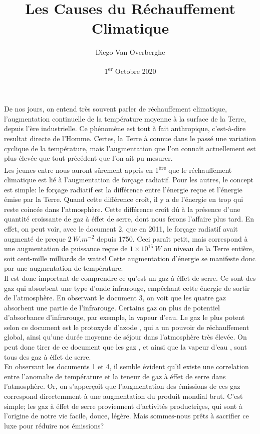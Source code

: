 \documentclass[12pt]{article}
\title{Les Causes du Réchauffement Climatique}
\author{Diego Van Overberghe}
\date{1\textsuperscript{er} Octobre 2020}
\begin{document}
    \maketitle
    De nos jours, on entend très souvent parler de réchauffement climatique, l'augmentation continuelle de la température moyenne à la surface de la Terre, depuis l'ère industrielle. Ce phénomène est tout à fait anthropique, c'est-à-dire resultat directe de l'Homme. Certes, la Terre à connue dans le passé une variation cyclique de la température, mais l'augmentation que l'on connaît actuellement est plus élevée que tout précédent que l'on ait pu mesurer. \\[1ex]

    \indent Les jeunes entre nous auront sûrement appris en 1\textsuperscript{ère} que le réchauffement climatique est lié à l'augmentation de forçage radiatif. Pour les autres, le concept est simple: le forçage radiatif est la différence entre l'énergie reçue et l'énergie émise par la Terre. Quand cette différence croît, il y a de l'énergie en \guillemotleft{} trop \guillemotright{} qui reste coincée dans l'atmosphère. Cette différence croît dû à la présence d'une quantité croissante de gaz à éffet de serre, dont nous ferons l'affaire plus tard. En effet, on peut voir, avec le document 2, que en 2011, le forçage radiatif avait augmenté de preque $2\ \si{W.m^{-2}}$ depuis 1750. Ceci paraît petit, mais correspond à une augmentation de puissance reçue de $1\times 10^{15}\ \si{W}$ au niveau de la Terre entière, soit cent-mille milliards de watts! Cette augmentation d'énergie se manifeste donc par une augmentation de température. \\[1ex]

    \indent Il est donc important de comprendre ce qu'est un gaz à éffet de serre. Ce sont des gaz qui absorbent une type d'onde infrarouge, empêchant cette énergie de sortir de l'atmosphère. En observant le document 3, on voit que les quatre gaz absorbent une partie de l'infrarouge. Certains gaz on plus de potentiel d'absorbance d'infrarouge, par exemple, la vapeur d'eau. Le gaz le plus \guillemotleft{} potent \guillemotright{} selon ce document est le protoxyde d'azode , qui a un pouvoir de réchauffement global, ainsi qu'une durée moyenne de séjour dans l'atmosphère très élevée. On peut donc tirer de ce document que les gaz ,  et  ainsi que la vapeur d'eau , sont tous des gaz à éffet de serre. \\[1ex]

    \indent En observant les documents 1 et 4, il semble évident qu'il existe une correlation entre l'anomalie de température et la teneur de gaz à éffet de serre dans l'atmosphère. Or, on s'apperçoit que l'augmentation des émissions de ces gaz correspond directemment à une augmentation du produit mondial brut. C'est simple; les gaz à éffet de serre proviennent d'activités productriçes, qui sont à l'origine de notre vie facile, douce, légère. Mais sommes-nous prêts à sacrifier ce luxe pour réduire nos émissions?\\[1ex]
\end{document}
